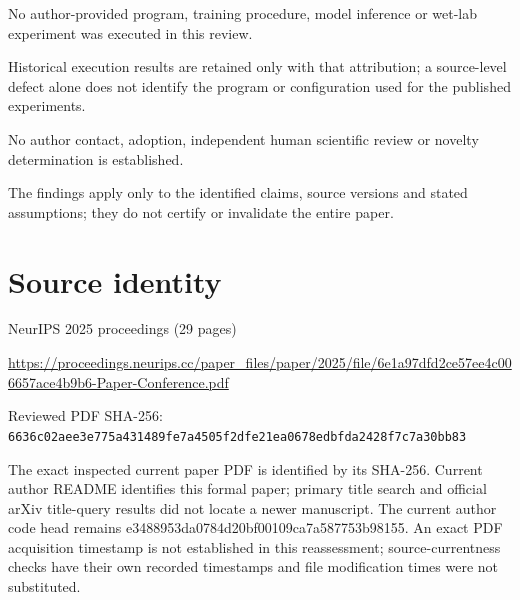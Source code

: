 \documentclass[11pt]{article}
\begin{document}
No author-provided program, training procedure, model inference or wet-lab experiment was executed in this review.\par

Historical execution results are retained only with that attribution; a source-level defect alone does not identify the program or configuration used for the published experiments.\par

No author contact, adoption, independent human scientific review or novelty determination is established.\par

The findings apply only to the identified claims, source versions and stated assumptions; they do not certify or invalidate the entire paper.\par

\section*{Source identity}

NeurIPS 2025 proceedings (29 pages)

\url{https://proceedings.neurips.cc/paper_files/paper/2025/file/6e1a97dfd2ce57ee4c006657ace4b9b6-Paper-Conference.pdf}

Reviewed PDF SHA-256: \nolinkurl{6636c02aee3e775a431489fe7a4505f2dfe21ea0678edbfda2428f7c7a30bb83}

The exact inspected current paper PDF is identified by its SHA-256. Current author README identifies this formal paper; primary title search and official arXiv title-query results did not locate a newer manuscript. The current author code head remains e3488953da0784d20bf00109ca7a587753b98155. An exact PDF acquisition timestamp is not established in this reassessment; source-currentness checks have their own recorded timestamps and file modification times were not substituted.
\end{document}

